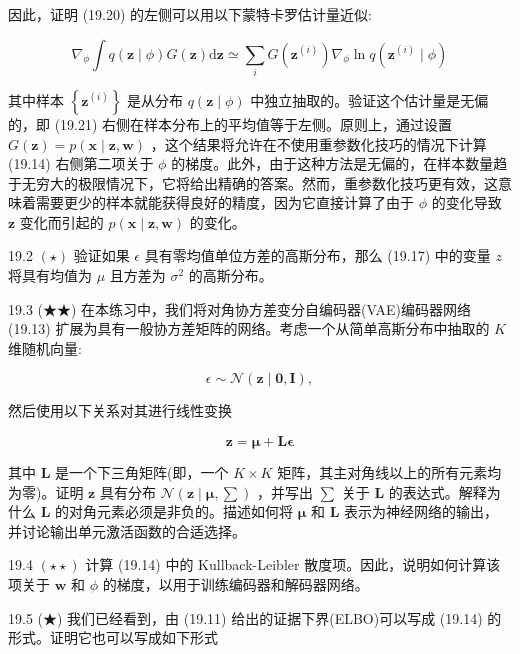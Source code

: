 \documentclass[10pt]{article}
\begin{document}
因此，证明 (19.20) 的左侧可以用以下蒙特卡罗估计量近似:

\[
{\nabla }_{\phi }\int q\left( {\mathbf{z} \mid  \phi }\right) G\left( \mathbf{z}\right) \mathrm{d}\mathbf{z} \simeq  \mathop{\sum }\limits_{i}G\left( {\mathbf{z}}^{\left( i\right) }\right) {\nabla }_{\phi }\ln q\left( {{\mathbf{z}}^{\left( i\right) } \mid  \phi }\right)  \tag{19.21}
\]

其中样本 \(\left\{  {\mathbf{z}}^{\left( i\right) }\right\}\) 是从分布 \(q\left( {\mathbf{z} \mid  \phi }\right)\) 中独立抽取的。验证这个估计量是无偏的，即 (19.21) 右侧在样本分布上的平均值等于左侧。原则上，通过设置 \(G\left( \mathbf{z}\right)  = p\left( {\mathbf{x} \mid  \mathbf{z},\mathbf{w}}\right)\) ，这个结果将允许在不使用重参数化技巧的情况下计算 (19.14) 右侧第二项关于 \(\phi\) 的梯度。此外，由于这种方法是无偏的，在样本数量趋于无穷大的极限情况下，它将给出精确的答案。然而，重参数化技巧更有效，这意味着需要更少的样本就能获得良好的精度，因为它直接计算了由于 \(\phi\) 的变化导致 \(\mathbf{z}\) 变化而引起的 \(p\left( {\mathbf{x} \mid  \mathbf{z},\mathbf{w}}\right)\) 的变化。

19.2 \(\left( \star \right)\) 验证如果 \(\epsilon\) 具有零均值单位方差的高斯分布，那么 (19.17) 中的变量 \(z\) 将具有均值为 \(\mu\) 且方差为 \({\sigma }^{2}\) 的高斯分布。

19.3 (★★) 在本练习中，我们将对角协方差变分自编码器(VAE)编码器网络 (19.13) 扩展为具有一般协方差矩阵的网络。考虑一个从简单高斯分布中抽取的 \(K\) 维随机向量:

\[
\epsilon  \sim  \mathcal{N}\left( {\mathbf{z} \mid  \mathbf{0},\mathbf{I}}\right) , \tag{19.22}
\]

然后使用以下关系对其进行线性变换

\[
\mathbf{z} = \mathbf{\mu } + \mathbf{L}\mathbf{\epsilon } \tag{19.23}
\]

其中 \(\mathbf{L}\) 是一个下三角矩阵(即，一个 \(K \times  K\) 矩阵，其主对角线以上的所有元素均为零)。证明 \(\mathbf{z}\) 具有分布 \(\mathcal{N}\left( {\mathbf{z} \mid  \mathbf{\mu },\mathbf{\sum }}\right)\) ，并写出 \(\mathbf{\sum }\) 关于 \(\mathbf{L}\) 的表达式。解释为什么 \(\mathbf{L}\) 的对角元素必须是非负的。描述如何将 \(\mathbf{\mu }\) 和 \(\mathbf{L}\) 表示为神经网络的输出，并讨论输出单元激活函数的合适选择。

19.4 \(\left( {\star  \star  }\right)\) 计算 (19.14) 中的 Kullback-Leibler 散度项。因此，说明如何计算该项关于 \(\mathbf{w}\) 和 \(\phi\) 的梯度，以用于训练编码器和解码器网络。

19.5 (★) 我们已经看到，由 (19.11) 给出的证据下界(ELBO)可以写成 (19.14) 的形式。证明它也可以写成如下形式
\end{document}
